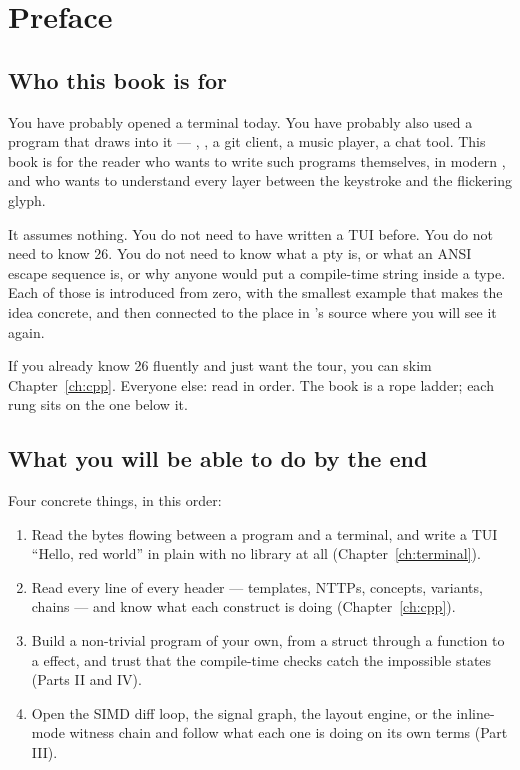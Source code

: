\documentclass[11pt,openany,oneside]{book}
\begin{document}
\chapter*{Preface}

\section*{Who this book is for}

You have probably opened a terminal today. You have probably also
used a program that draws into it --- , , a git
client, a music player, a chat tool. This book is for the reader who
wants to write such programs themselves, in modern \cpp{}, and who
wants to understand every layer between the keystroke and the
flickering glyph.

It assumes nothing. You do not need to have written a TUI before. You
do not need to know \cpp{}26. You do not need to know what a pty is,
or what an ANSI escape sequence is, or why anyone would put a
compile-time string inside a type. Each of those is introduced from
zero, with the smallest example that makes the idea concrete, and
then connected to the place in \maya{}'s source where you will see
it again.

If you already know \cpp{}26 fluently and just want the \maya{}
tour, you can skim Chapter~\ref{ch:cpp}. Everyone else: read in
order. The book is a rope ladder; each rung sits on the one below
it.

\section*{What you will be able to do by the end}

Four concrete things, in this order:

\begin{enumerate}[leftmargin=*]
  \item Read the bytes flowing between a program and a terminal,
    and write a TUI ``Hello, red world'' in plain \cpp{} with no
    library at all (Chapter~\ref{ch:terminal}).
  \item Read every line of every \maya{} header --- templates,
    NTTPs, concepts, variants,  chains --- and know
    what each construct is doing (Chapter~\ref{ch:cpp}).
  \item Build a non-trivial \maya{} program of your own, from a
     struct through a  function to a
     effect, and trust that the compile-time checks
    catch the impossible states (Parts II and IV).
  \item Open the SIMD diff loop, the signal graph, the layout
    engine, or the inline-mode witness chain and follow what each
    one is doing on its own terms (Part III).
\end{enumerate}
\end{document}
